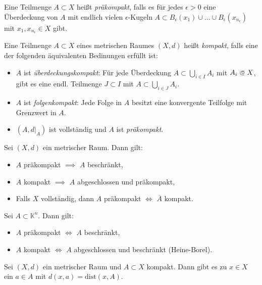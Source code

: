 \documentclass{cheat-sheet}
\newcommand{\K}{\mathbb{K}}
\newcommand{\dist}{\mathrm{dist}} %
\begin{document}
\begin{defn}
  Eine Teilmenge $A \subset X$ heißt \emph{präkompakt}, falls es für jedes $\epsilon > 0$ eine Überdeckung von $A$ mit endlich vielen $\epsilon$-Kugeln $A \subset B_{\epsilon}(x_1) \cup ... \cup B_{\epsilon}(x_{n_\epsilon})$ mit $x_1, x_{n_\epsilon} \in X$ gibt.
\end{defn}

\begin{defn}
  Eine Teilmenge $A \subset X$ eines metrischen Raumes $(X, d)$ heißt \emph{kompakt}, falls eine der folgenden äquivalenten Bedinungen erfüllt ist:
  \begin{itemize}
    \item $A$ ist \emph{überdeckungskompakt}: Für jede Überdeckung $A \subset \bigcup_{i \in I} A_i$ mit $A_i \opn X$,  gibt es eine endl. Teilmenge $J \subset I$ mit $A \subset \bigcup_{i \in J} A_i$.
    \item $A$ ist \emph{folgenkompakt}: Jede Folge in $A$ besitzt eine konvergente Teilfolge mit Grenzwert in $A$.
    \item $(A, d|_A)$ ist vollständig und $A$ ist \emph{präkompakt}.
  \end{itemize}
\end{defn}

\begin{satz}
  Sei $(X, d)$ ein metrischer Raum. Dann gilt:
  \begin{itemize}
    \item $A$ präkompakt $\implies$ $A$ beschränkt,
    \item $A$ kompakt $\implies$ $A$ abgeschlossen und präkompakt,
    \item Falls $X$ vollständig, dann $A$ präkompakt $\iff$ $\overline{A}$ kompakt.
  \end{itemize}
\end{satz}

\begin{satz}
  Sei $A \subset \K^n$. Dann gilt:
  \begin{itemize}
    \item $A$ präkompakt $\iff$ $A$ beschränkt,
    \item $A$ kompakt $\iff$ $A$ abgeschlossen und beschränkt (Heine-Borel).
  \end{itemize}
\end{satz}

\begin{satz}
  Sei $(X, d)$ ein metrischer Raum und $A \subset X$ kompakt. Dann gibt es zu $x \in X$ ein $a \in A$ mit $d(x, a) = \dist(x, A)$.
\end{satz}
\end{document}
